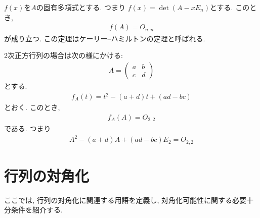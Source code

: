\begin{remark}
  \label{thm:cht:general}
  $f(x)$を$A$の固有多項式とする.
  つまり $f(x)=\det(A-xE_n)$とする.
  このとき,
  \begin{align*}
    f(A)=O_{n,n}
  \end{align*}
  が成り立つ.
  この定理はケーリー--ハミルトンの定理と呼ばれる.
\end{remark}
\begin{remark}
    2次正方行列の場合は次の様にかける:
  \label{thm:cht:2dim}
  \begin{align*}
    A=
    \begin{pmatrix}
      a&b\\c&d
    \end{pmatrix}
  \end{align*}
  とする.
  \begin{align*}
    f_A(t)=t^2-(a+d)t+(ad-bc)
  \end{align*}
  とおく. このとき,
  \begin{align*}
    f_A(A)=O_{2,2}
  \end{align*}
  である. つまり
  \begin{align*}
    A^2-(a+d)A+(ad-bc)E_2=O_{2,2}
  \end{align*}
\end{remark}

\section{行列の対角化}
ここでは,
行列の対角化に関連する用語を定義し,
対角化可能性に関する必要十分条件を紹介する.

